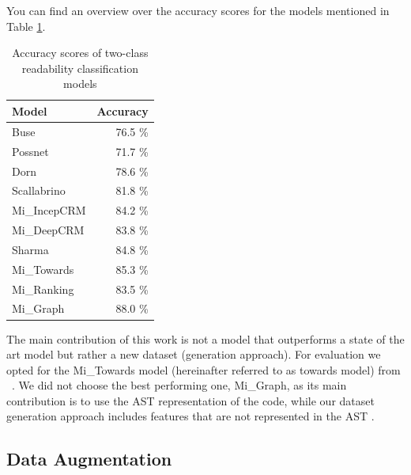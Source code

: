 \documentclass[%
class=scrreprt,
chapterprefix=false,%
open=right,%
twoside=false,%
paper=a4,%
logofile={Logo\_zentral\_farbig\_EN.png},%
thesistype=master,%
UKenglish,%
]{se2thesis}
\theoremstyle{definition}
\begin{document}
	You can find an overview over the accuracy scores for the models mentioned in Table \ref{tab:rel-acc-scores}.
	\begin{table}[ht]
		\centering
		\caption{Accuracy scores of two-class readability classification models}
		\vspace{8pt}
		\label{tab:rel-acc-scores}
		\begin{tabular}{lr}
			\toprule
			\textbf{Model} & \textbf{Accuracy} \\
			\midrule
			Buse \cite{buse2009learning} & 76.5 \% \\
			Possnet \cite{posnett2011simpler} & 71.7 \% \\
			Dorn \cite{dorn2012general} & 78.6 \% \\
			Scallabrino \cite{scalabrino2016improving} & 81.8 \% \\
			Mi\_IncepCRM \cite{mi2018inception} & 84.2 \% \\
			Mi\_DeepCRM \cite{mi2018improving} & 83.8 \% \\
			Sharma \cite{sharma2020egan} & 84.8 \% \\
			Mi\_Towards \cite{mi2022towards} & 85.3 \% \\
			Mi\_Ranking \cite{mi2022rank} & 83.5 \% \\
			Mi\_Graph \cite{mi2023graph} & 88.0 \% \\
			\bottomrule
		\end{tabular}
	\end{table}
	
	The main contribution of this work is not a model that outperforms a state of the art model but rather a new dataset (generation approach). For evaluation we opted for the Mi\_Towards model (hereinafter referred to as towards model) from \citeauthor{mi2022towards}~\cite{mi2022towards}. We did not choose the best performing one, Mi\_Graph, as its main contribution is to use the AST representation of the code, while our dataset generation approach includes features that are not represented in the AST \cite{mi2023graph}.
			
\subsection{Data Augmentation} \label{Data Augmentation}
\end{document}
